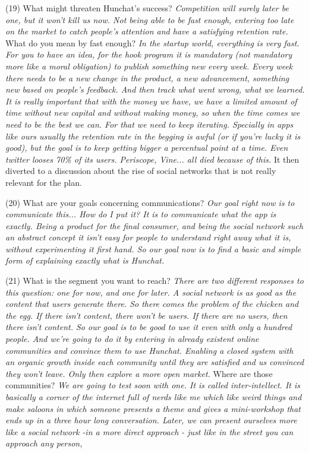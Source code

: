 \documentclass[12pt]{article}
\begin{document}
(19) What might threaten Hunchat’s success? \textit{Competition will surely later be one, but it won't kill us now. Not being able to be fast enough, entering too late on the market to catch people's attention and have a satisfying retention rate.} What do you mean by fast enough? \textit{In the startup world, everything is very fast. For you to have an idea, for the hook program it is mandatory (not mandatory more like a moral obligation) to publish something new every week. Every week there needs to be a new change in the product, a new advancement, something new based on people's feedback. And then track what went wrong, what we learned. It is really important that with the money we have, we have a limited amount of time without new capital and without making money, so when the time comes we need to be the best we can. For that we need to keep iterating. Specially in apps like ours usually the retention rate in the begging is awful (or if you're lucky it is good), but the goal is to keep getting bigger a percentual point at a time. Even twitter looses 70\% of its users. Periscope, Vine... all died because of this.} It then diverted to a discussion about the rise of social networks that is not really relevant for the plan.

(20) What are your goals concerning communications? \textit{Our goal right now is to communicate this... How do I put it? It is to communicate what the app is exactly. Being a product for the final consumer, and being the social network such an abstract concept it isn't easy for people to understand right away what it is, without experimenting it first hand. So our goal now is to find a basic and simple form of explaining exactly what is Hunchat.}

(21) What is the segment you want to reach? \textit{There are two different responses to this question: one for now, and one for later. A social network is as good as the content that users generate there. So there comes the problem of the chicken and the egg. If there isn't content, there won't be users. If there are no users, then there isn't content. So our goal is to be good to use it even with only a hundred people. And we're going to do it by entering in already existent online communities and convince them to use Hunchat. Enabling a closed system with an organic growth inside each community until they are satisfied and us convinced they won't leave. Only then explore a more open market.} Where are those communities? \textit{We are going to test soon with one. It is called inter-intellect. It is basically a corner of the internet full of nerds like me which like weird things and make saloons in which someone presents a theme and gives a mini-workshop that ends up in a three hour long conversation. Later, we can present ourselves more like a social network -in a more direct approach - just like in the street you can approach any person,}
\end{document}
